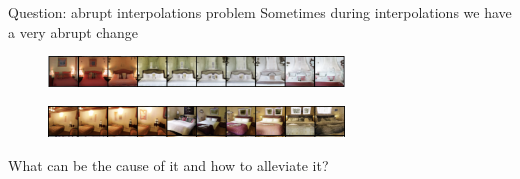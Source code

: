 \documentclass[10pt, handout]{beamer}
\begin{document}
\begin{frame}{Question: abrupt interpolations problem}
\pause
Sometimes during interpolations we have a very abrupt change

\pause
\begin{figure}
    \centering
    \includegraphics[width=0.7\textwidth]{images/abrupt-changes-1}
\end{figure}
\begin{figure}
    \centering
    \includegraphics[width=0.7\textwidth]{images/abrupt-changes-2}
\end{figure}

\pause
What can be the cause of it and how to alleviate it?
\end{frame}
\end{document}
